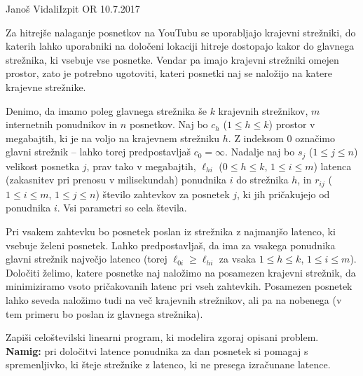 \begin{naloga}{Janoš Vidali}{Izpit OR 10.7.2017}
\begin{vprasanje}
Za hitrejše nalaganje posnetkov na YouTubu se uporabljajo krajevni strežniki,
do katerih lahko uporabniki na določeni lokaciji hitreje dostopajo
kakor do glavnega strežnika, ki vsebuje vse posnetke.
Vendar pa imajo krajevni strežniki omejen prostor,
zato je potrebno ugotoviti,
kateri posnetki naj se naložijo na katere krajevne strežnike.

Denimo, da imamo poleg glavnega strežnika še $k$ krajevnih strežnikov,
$m$ internetnih po\-nud\-ni\-kov in $n$ posnetkov.
Naj bo $c_h$ ($1 \le h \le k$) prostor v megabajtih,
ki je na voljo na krajevnem strežniku $h$.
Z indeksom $0$ označimo glavni strežnik
-- lahko torej predpostavljaš $c_0 = \infty$.
Nadalje naj bo $s_j$ ($1 \le j \le n$) velikost posnetka $j$,
prav tako v megabajtih,
$\ell_{hi}$ ($0 \le h \le k$, $1 \le i \le m$)
latenca (zakasnitev pri prenosu v milisekundah)
ponudnika $i$ do strežnika $h$,
in $r_{ij}$ ($1 \le i \le m$, $1 \le j \le n$)
število zahtevkov za posnetek $j$, ki jih pričakujejo od ponudnika $i$.
Vsi parametri so cela števila.

Pri vsakem zahtevku bo posnetek poslan iz strežnika z najmanjšo latenco,
ki vsebuje želeni posnetek.
Lahko predpostavljaš,
da ima za vsakega ponudnika glavni strežnik največjo latenco
(torej $\ell_{0i} \ge \ell_{hi}$ za vsaka $1 \le h \le k$, $1 \le i \le m$).
Določiti želimo, katere posnetke naj naložimo na posamezen krajevni strežnik,
da minimiziramo vsoto pričakovanih latenc pri vseh zahtevkih.
Posamezen posnetek lahko seveda naložimo tudi na več krajevnih strežnikov,
ali pa na nobenega (v tem primeru bo poslan iz glavnega strežnika).

Zapiši celoštevilski linearni program, ki modelira zgoraj opisani problem. \\
{\small {\bf Namig:}
pri določitvi latence ponudnika za dan posnetek si pomagaj s spremenljivko,
ki šteje strežnike z latenco, ki ne presega izračunane latence.}
\end{vprasanje}
\begin{odgovor}
\end{odgovor}
\end{naloga}



